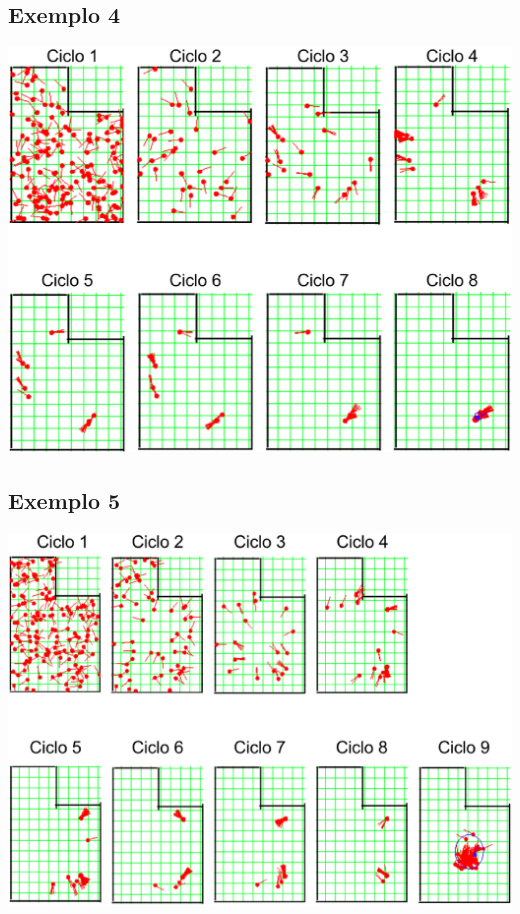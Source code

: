\subsection{Exemplo 4}

{\centering
\includegraphics[scale=0.4]{figuras/cen4_ex4.eps}
\label{img:cen4_ex4}
\par}

\subsection{Exemplo 5}

{\centering
\includegraphics[scale=0.4]{figuras/cen4_ex5.eps}
\label{img:cen4_ex5}
\par}
